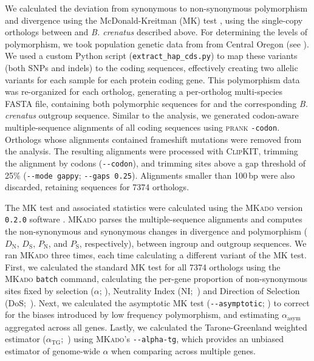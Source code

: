 We calculated the deviation from synonymous to non-synonymous polymorphism and
divergence using the McDonald-Kreitman (MK) test \citep{mcdonald_adaptive_1991},
using the single-copy orthologs between \bgla{} and \textit{B. crenatus} described
above.
For determining the levels of polymorphism, we took population genetic data from
\bgla{} from Central Oregon (see ).
We used a custom Python script (\texttt{extract\_hap\_cds.py}) to map these
variants (both SNPs and indels) to the \bgla{} coding sequences, effectively
creating two allelic variants for each sample for each protein coding gene.
This polymorphism data was re-organized for each ortholog, generating a
per-ortholog multi-species FASTA file, containing both polymorphic sequences for
\bgla{} and the corresponding \textit{B. crenatus} outgroup sequence.
Similar to the \dnds{} analysis, we generated codon-aware multiple-sequence
alignments of all coding sequences using \textsc{prank} \texttt{-codon}.
Orthologs whose alignments contained frameshift mutations were removed from the
analysis.
The resulting alignments were processed with \textsc{ClipKIT}, trimming the
alignment by codons (\texttt{-{}-codon}), and trimming sites above a gap threshold
of 25\% (\texttt{-{}-mode gappy}; \texttt{-{}-gaps 0.25}).
Alignments smaller than 100\,bp were also discarded, retaining sequences for \num{7374}
orthologs.
\vspace{0.1cm}

The MK test and associated statistics were calculated using the \textsc{MKado}
version \texttt{0.2.0} software \citep{mkado_2026}.
\textsc{MKado} parses the multiple-sequence alignments and computes the 
non-synonymous and synonymous changes in divergence and polymorphism
($D_\text{N}$, $D_\text{S}$, $P_\text{N}$, and $P_\text{S}$,
respectively), between ingroup and outgroup sequences.
We ran \textsc{MKado} three times, each time calculating a different variant of
the MK test.
First, we calculated the standard MK test \citep{mcdonald_adaptive_1991} for all
\num{7374} orthologs using the \textsc{MKado} \texttt{batch} command, calculating the
per-gene proportion of non-synonymous sites fixed by selection ($\alpha$;
\citealp{smith_adaptive_2002}), Neutrality Index (NI;~\citealp{rand_excess_1996})
and Direction of Selection (DoS;~\citealp{stoletzki_estimation_2011}).
Next, we calculated the asymptotic MK test (\texttt{-{}-asymptotic};
\citealp{messer_frequent_2013}) to correct for the biases introduced by low
frequency polymorphism, and estimating $\alpha_\text{asym}$ aggregated across
all genes.
Lastly, we calculated the Tarone-Greenland weighted estimator
($\alpha_\text{TG}$;~\citealp{stoletzki_estimation_2011}) using
\textsc{MKado}'s \texttt{-{}-alpha-tg}, which provides an unbiased estimator of
genome-wide $\alpha$ when comparing across multiple genes.

